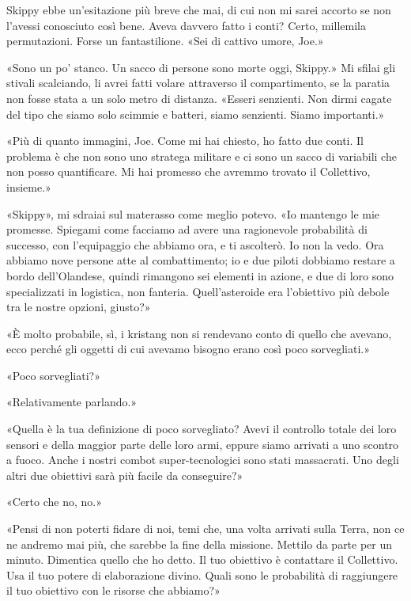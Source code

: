 Skippy ebbe un'esitazione più breve che mai, di cui non mi sarei accorto
se non l'avessi conosciuto così bene. Aveva davvero fatto i conti?
Certo, millemila permutazioni. Forse un fantastilione. «Sei di cattivo
umore, Joe.»

«Sono un po' stanco. Un sacco di persone sono morte oggi, Skippy.» Mi
sfilai gli stivali scalciando, li avrei fatti volare attraverso il
compartimento, se la paratia non fosse stata a un solo metro di
distanza. «Esseri senzienti. Non dirmi cagate del tipo che siamo solo
scimmie e batteri, siamo senzienti. Siamo importanti.»

«Più di quanto immagini, Joe. Come mi hai chiesto, ho fatto due conti.
Il problema è che non sono uno stratega militare e ci sono un sacco di
variabili che non posso quantificare. Mi hai promesso che avremmo
trovato il Collettivo, insieme.»

«Skippy», mi sdraiai sul materasso come meglio potevo. «Io mantengo le
mie promesse. Spiegami come facciamo ad avere una ragionevole
probabilità di successo, con l'equipaggio che abbiamo ora, e ti
ascolterò. Io non la vedo. Ora abbiamo nove persone atte al
combattimento; io e due piloti dobbiamo restare a bordo dell'Olandese,
quindi rimangono sei elementi in azione, e due di loro sono
specializzati in logistica, non fanteria. Quell'asteroide era
l'obiettivo più debole tra le nostre opzioni, giusto?»

«È molto probabile, sì, i kristang non si rendevano conto di quello che
avevano, ecco perché gli oggetti di cui avevamo bisogno erano così poco
sorvegliati.»

«Poco sorvegliati?»

«Relativamente parlando.»

«Quella è la tua definizione di poco sorvegliato? Avevi il controllo
totale dei loro sensori e della maggior parte delle loro armi, eppure
siamo arrivati a uno scontro a fuoco. Anche i nostri combot
super-tecnologici sono stati massacrati. Uno degli altri due obiettivi
sarà più facile da conseguire?»

«Certo che no, no.»

«Pensi di non poterti fidare di noi, temi che, una volta arrivati sulla
Terra, non ce ne andremo mai più, che sarebbe la fine della missione.
Mettilo da parte per un minuto. Dimentica quello che ho detto. Il tuo
obiettivo è contattare il Collettivo. Usa il tuo potere di elaborazione
divino. Quali sono le probabilità di raggiungere il tuo obiettivo con le
risorse che abbiamo?»


